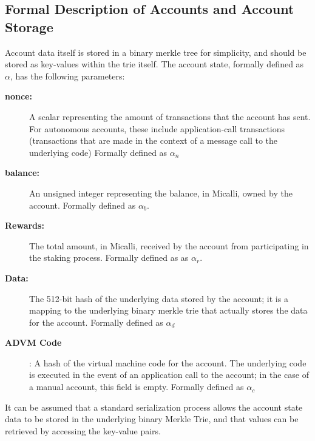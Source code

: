 \documentclass[conference]{IEEEtran}
\begin{document}
\subsection {Formal Description of Accounts and Account Storage}
 Account data itself is stored in a binary merkle tree for simplicity, and should be stored as key-values within the trie itself. The account state, formally defined as $\alpha$, has the following parameters:
 
 \begin{description}
\item[\textbf{nonce:}]\hspace{3}  A scalar representing the amount of transactions that the account has sent. For autonomous accounts, these include application-call transactions (transactions that are made in the context of a message call to the underlying code) Formally defined as $\alpha_n$
\item[\textbf{balance:}]\hspace{10}  An unsigned integer representing the balance, in Micalli, owned by the account. Formally defined as $\alpha_b$.
\item[\textbf{Rewards:}]\hspace{10}  The total amount, in Micalli, received by the account from participating in the staking process. Formally defined as as $\alpha_r$.
\item[\textbf{Data:}] The 512-bit hash of the underlying data stored by the account; it is a mapping to the underlying binary merkle trie that actually stores the data for the account. Formally defined as $\alpha_d$
\item[\textbf{ADVM Code}]\hspace{30}: A hash of the virtual machine code for the account. The underlying code is executed in the event of an application call to the account; in the case of a manual account, this field is empty. Formally defined as $\alpha_c$ 
\end{description}

It can be assumed that a standard serialization process allows the account state data to be stored in the underlying binary Merkle Trie, and that values can be retrieved by accessing the key-value pairs. 
\end{document}

